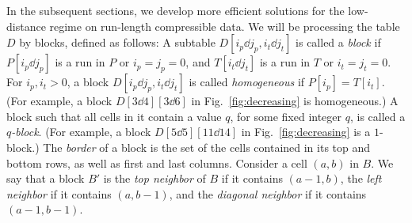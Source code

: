 In the subsequent sections, we develop more efficient solutions for the low-distance regime on run-length compressible data. We will be processing the table $D$ by blocks, defined as follows: A subtable $D[i_p \dd j_p, i_t \dd j_t]$ is called a \emph{block} if $P[i_p\dd j_p]$ is a run in $P$ or $i_p=j_p=0$, and $T[i_t \dd j_t]$ is a run in $T$ or $i_t=j_t=0$. For $i_p,i_t > 0$, a block $D[i_p \dd j_p, i_t \dd j_t]$ is called \emph{homogeneous} if $P[i_p] = T[i_t]$. (For example, a block $D[3\dd 4][3\dd 6]$ in Fig.~\ref{fig:decreasing} is homogeneous.) A block such that all cells in it contain a value $q$, for some fixed integer $q$, is called a \emph{$q$-block}. (For example, a block $D[5 \dd 5][11\dd 14]$ in Fig.~\ref{fig:decreasing} is a $1$-block.) The \emph{border} of a block is the set of the cells contained in its top and bottom rows, as well as first and last columns. Consider a cell $(a,b)$ in $B$. We say that a block $B'$ is the \emph{top neighbor} of $B$ if it contains $(a-1,b)$, the \emph{left neighbor} if it contains $(a,b-1)$, and the \emph{diagonal neighbor} if it contains $(a-1,b-1)$. 

